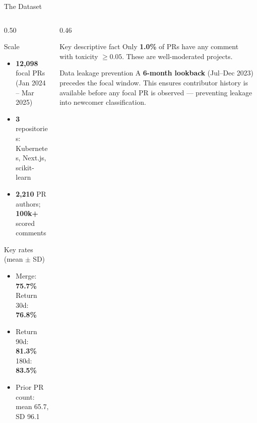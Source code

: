 \documentclass[aspectratio=169,11pt]{beamer}
\begin{document}
\begin{frame}{The Dataset}
\begin{columns}[T]
\begin{column}{0.50\textwidth}
\begin{block}{Scale}
\begin{itemize}
  \item \textbf{12,098} focal PRs (Jan 2024 -- Mar 2025)
  \item \textbf{3} repositories: Kubernetes, Next.js, scikit-learn
  \item \textbf{2,210} PR authors; \textbf{100k+} scored comments
\end{itemize}
\end{block}

\begin{exampleblock}{Key rates (mean $\pm$ SD)}
\begin{itemize}
  \item Merge: \textbf{75.7\%} \quad Return 30d: \textbf{76.8\%}
  \item Return 90d: \textbf{81.3\%} \quad 180d: \textbf{83.5\%}
  \item Prior PR count: mean 65.7, SD 96.1
\end{itemize}
\end{exampleblock}
\end{column}

\begin{column}{0.46\textwidth}
\begin{alertblock}{Key descriptive fact}
Only \textbf{1.0\%} of PRs have any comment with toxicity $\geq 0.05$. These are well-moderated projects.
\end{alertblock}

\vspace{0.4em}
\begin{block}{Data leakage prevention}
A \textbf{6-month lookback} (Jul--Dec 2023) precedes the focal window. This ensures contributor history is available before any focal PR is observed --- preventing leakage into newcomer classification.
\end{block}
\end{column}
\end{columns}
\end{frame}
\end{document}
